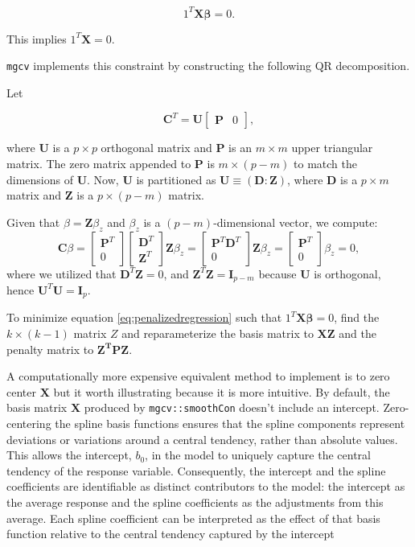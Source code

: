 \documentclass[
11pt, %
oneside, %
english, %
singlespacing, %
]{macthesis} %
\begin{document}
\[
1^T\mathbf{X\beta} = 0.
\]

This implies \(1^T\mathbf{X} = 0\).

\texttt{mgcv} implements this constraint by constructing the following QR decomposition.

Let

\[ 
\mathbf{C}^T = \mathbf{U} \begin{bmatrix} \mathbf{P} & 0 \end{bmatrix}, 
\]

where \(\mathbf{U}\) is a \(p \times p\) orthogonal matrix and \(\mathbf{P}\) is an \(m \times m\) upper triangular matrix. The zero matrix appended to \(\mathbf{P}\) is \(m \times (p-m)\) to match the dimensions of \(\mathbf{U}\). Now, \(\mathbf{U}\) is partitioned as \(\mathbf{U} \equiv (\mathbf{D} : \mathbf{Z})\), where \(\mathbf{D}\) is a \(p \times m\) matrix and \(\mathbf{Z}\) is a \(p \times (p-m)\) matrix.

Given that \(\beta = \mathbf{Z}\beta_z\) and \(\beta_z\) is a \((p-m)\)-dimensional vector, we compute:
\[
   \mathbf{C}\beta = \begin{bmatrix} \mathbf{P}^T \\ 0 \end{bmatrix} \begin{bmatrix} \mathbf{D}^T \\ \mathbf{Z}^T \end{bmatrix} \mathbf{Z}\beta_z = \begin{bmatrix} \mathbf{P}^T\mathbf{D}^T \\ 0 \end{bmatrix} \mathbf{Z}\beta_z = \begin{bmatrix} \mathbf{P}^T \\ 0 \end{bmatrix} \beta_z = 0,
   \]
where we utilized that \(\mathbf{D}^T\mathbf{Z} = 0\), and \(\mathbf{Z}^T\mathbf{Z} = \mathbf{I}_{p-m}\) because \(\mathbf{U}\) is orthogonal, hence \(\mathbf{U}^T\mathbf{U} = \mathbf{I}_p\).

To minimize equation \ref{eq:penalizedregression} such that \(1^T\mathbf{X\beta} = 0\),
find the \(k \times (k-1)\) matrix \(Z\) and reparameterize the basis matrix to \(\mathbf{XZ}\) and the penalty matrix to \(\mathbf{Z^TPZ}\).

A computationally more expensive equivalent method to implement is to zero center \(\mathbf{X}\) but it worth illustrating because it is more intuitive. By default, the basis matrix \(\mathbf{X}\) produced by \texttt{mgcv::smoothCon} doesn't include an intercept. Zero-centering the spline basis functions ensures that the spline components represent deviations or variations around a central tendency, rather than absolute values. This allows the intercept, \(b_0\), in the model to uniquely capture the central tendency of the response variable. Consequently, the intercept and the spline coefficients are identifiable as distinct contributors to the model: the intercept as the average response and the spline coefficients as the adjustments from this average. Each spline coefficient can be interpreted as the effect of that basis function relative to the central tendency captured by the intercept
\end{document}
